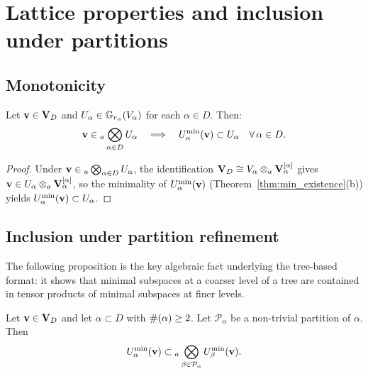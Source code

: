 \section{Lattice properties and inclusion under partitions}
\label{sec:min:lattice}

\subsection*{Monotonicity}

\begin{proposition}
\label{prop:min_monotone}
Let $\mathbf{v} \in \mathbf{V}_D$ and $U_\alpha \in \mathbb{G}_{r_\alpha}(V_\alpha)$
for each $\alpha \in D$. Then:
\begin{equation*}
    \mathbf{v} \in {}_a\bigotimes_{\alpha \in D} U_\alpha
    \quad \Longrightarrow \quad
    U^{\min}_{\alpha}(\mathbf{v}) \subset U_\alpha \quad \forall\, \alpha \in D.
\end{equation*}
\end{proposition}

\begin{proof}
Under $\mathbf{v} \in {}_a\bigotimes_{\alpha \in D} U_\alpha$, the identification
$\mathbf{V}_D \cong V_\alpha \otimes_a \mathbf{V}_\alpha^{[\alpha]}$ gives
$\mathbf{v} \in U_\alpha \otimes_a \mathbf{V}_\alpha^{[\alpha]}$,
so the minimality of $U^{\min}_{\alpha}(\mathbf{v})$ (Theorem~\ref{thm:min_existence}(b))
yields $U^{\min}_{\alpha}(\mathbf{v}) \subset U_\alpha$.
\end{proof}

\subsection*{Inclusion under partition refinement}

The following proposition is the key algebraic fact underlying the
tree-based format: it shows that minimal subspaces at a coarser
level of a tree are contained in tensor products of minimal subspaces
at finer levels.

\begin{proposition}
\label{prop:min_inclusion_partition}
Let $\mathbf{v} \in \mathbf{V}_D$ and let $\alpha \subset D$ with $\#(\alpha) \geq 2$.
Let $\mathcal{P}_\alpha$ be a non-trivial partition of $\alpha$. Then
\begin{equation}
\label{eq:min_inclusion}
    U^{\min}_{\alpha}(\mathbf{v}) \subset
    {}_a\bigotimes_{\beta \in \mathcal{P}_\alpha} U^{\min}_{\beta}(\mathbf{v}).
\end{equation}
\end{proposition}

